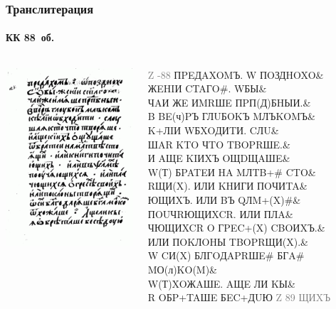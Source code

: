 \documentclass[xetex, aspectratio=169, russian]{beamer}
\begin{document}
\begin{frame}
  \frametitle{Транслитерация}
  \framesubtitle{КК 88~об.}

  \begin{columns}[c]
    \begin{column}{6cm}
      \includegraphics[width=5cm]{KK_src}
    \end{column}

    \begin{column}{6cm} \ttfamily \footnotesize
      \textcolor{gray}{Z -88} ПPEДAXOMЪ. W ПOЗДHOXO\& \\
      ЖEHIИ CTAГO\#. WБЫ\& \\
      ЧAИ ЖE ИMRШE ПPП(Д)БHЫИ.\& \\
      B BE(ч)PЪ ГЛUБOKЪ MЛЪKOMЪ\& \\
      K+ЛIИ WБXOДИTИ. CЛU\& \\
      ШAR KTO ЧTO TBOPRШE.\& \\
      И AЩE KIИXЪ OЩDЩAШE\& \\
      W(Т) БPATEИ HA MЛTB+\# CTO\& \\
      RЩИ(X). ИЛИ KHИГИ ПOЧИTA\& \\
      ЮЩИXЪ. ИЛИ BЪ QЛM+(X)\#\& \\
      ПOUЧRЮЩИXCR. ИЛИ ПЛA\& \\
      ЧЮЩИXCR O ГPEC+(X) CBOИXЪ.\& \\
      ИЛИ ПOKЛOHЫ TBOPRЩИ(X).\& \\
      W CИ(X) БЛГOДAPRШE\# БГA\# MО(л)KO(M)\& \\
      W(Т)XOЖAШE. AЩE ЛИ KЫ\& \\
      R OБP+TAШE БEC+ДUЮ \textcolor{gray}{Z 89 ЩИXЪ}
    \end{column}
  \end{columns}
\end{frame}
\end{document}
